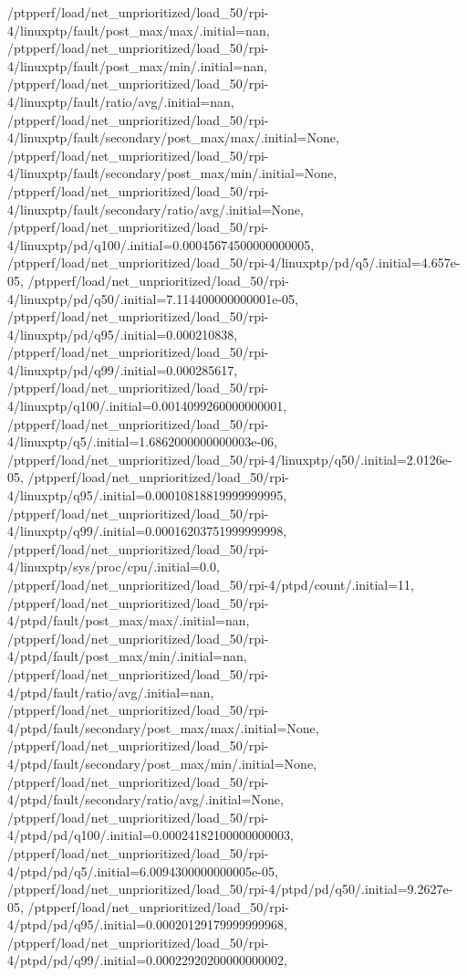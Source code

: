 {    /ptpperf/load/net_unprioritized/load_50/rpi-4/linuxptp/fault/post_max/max/.initial=nan,
    /ptpperf/load/net_unprioritized/load_50/rpi-4/linuxptp/fault/post_max/min/.initial=nan,
    /ptpperf/load/net_unprioritized/load_50/rpi-4/linuxptp/fault/ratio/avg/.initial=nan,
    /ptpperf/load/net_unprioritized/load_50/rpi-4/linuxptp/fault/secondary/post_max/max/.initial=None,
    /ptpperf/load/net_unprioritized/load_50/rpi-4/linuxptp/fault/secondary/post_max/min/.initial=None,
    /ptpperf/load/net_unprioritized/load_50/rpi-4/linuxptp/fault/secondary/ratio/avg/.initial=None,
    /ptpperf/load/net_unprioritized/load_50/rpi-4/linuxptp/pd/q100/.initial=0.00045674500000000005,
    /ptpperf/load/net_unprioritized/load_50/rpi-4/linuxptp/pd/q5/.initial=4.657e-05,
    /ptpperf/load/net_unprioritized/load_50/rpi-4/linuxptp/pd/q50/.initial=7.114400000000001e-05,
    /ptpperf/load/net_unprioritized/load_50/rpi-4/linuxptp/pd/q95/.initial=0.000210838,
    /ptpperf/load/net_unprioritized/load_50/rpi-4/linuxptp/pd/q99/.initial=0.000285617,
    /ptpperf/load/net_unprioritized/load_50/rpi-4/linuxptp/q100/.initial=0.0014099260000000001,
    /ptpperf/load/net_unprioritized/load_50/rpi-4/linuxptp/q5/.initial=1.6862000000000003e-06,
    /ptpperf/load/net_unprioritized/load_50/rpi-4/linuxptp/q50/.initial=2.0126e-05,
    /ptpperf/load/net_unprioritized/load_50/rpi-4/linuxptp/q95/.initial=0.00010818819999999995,
    /ptpperf/load/net_unprioritized/load_50/rpi-4/linuxptp/q99/.initial=0.00016203751999999998,
    /ptpperf/load/net_unprioritized/load_50/rpi-4/linuxptp/sys/proc/cpu/.initial=0.0,
    /ptpperf/load/net_unprioritized/load_50/rpi-4/ptpd/count/.initial=11,
    /ptpperf/load/net_unprioritized/load_50/rpi-4/ptpd/fault/post_max/max/.initial=nan,
    /ptpperf/load/net_unprioritized/load_50/rpi-4/ptpd/fault/post_max/min/.initial=nan,
    /ptpperf/load/net_unprioritized/load_50/rpi-4/ptpd/fault/ratio/avg/.initial=nan,
    /ptpperf/load/net_unprioritized/load_50/rpi-4/ptpd/fault/secondary/post_max/max/.initial=None,
    /ptpperf/load/net_unprioritized/load_50/rpi-4/ptpd/fault/secondary/post_max/min/.initial=None,
    /ptpperf/load/net_unprioritized/load_50/rpi-4/ptpd/fault/secondary/ratio/avg/.initial=None,
    /ptpperf/load/net_unprioritized/load_50/rpi-4/ptpd/pd/q100/.initial=0.00024182100000000003,
    /ptpperf/load/net_unprioritized/load_50/rpi-4/ptpd/pd/q5/.initial=6.0094300000000005e-05,
    /ptpperf/load/net_unprioritized/load_50/rpi-4/ptpd/pd/q50/.initial=9.2627e-05,
    /ptpperf/load/net_unprioritized/load_50/rpi-4/ptpd/pd/q95/.initial=0.00020129179999999968,
    /ptpperf/load/net_unprioritized/load_50/rpi-4/ptpd/pd/q99/.initial=0.00022920200000000002,
}
